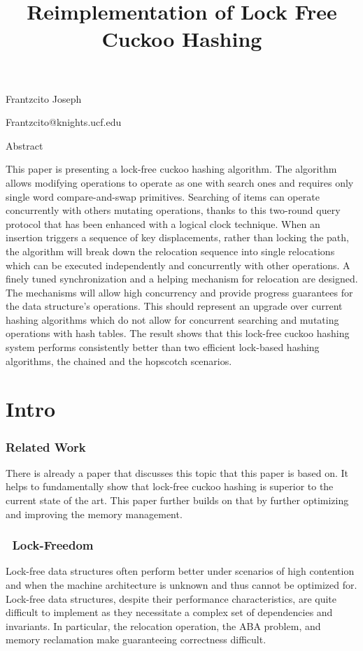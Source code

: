 \documentclass{article}
\title{}
\begin{document}
\title{Reimplementation of Lock Free Cuckoo Hashing}
\maketitle

Frantzcito Joseph

Frantzcito@knights.ucf.edu

Abstract

This paper is presenting a lock-free cuckoo hashing algorithm. The algorithm allows modifying operations to operate as
one with search ones and requires only single word compare-and-swap primitives. Searching of items can operate
concurrently with others mutating operations, thanks to this two-round query protocol that has been enhanced with a
logical clock technique. When an insertion triggers a sequence of key displacements, rather than locking the path, the
algorithm will break down the relocation sequence into single relocations which can be executed independently and
concurrently with other operations. A finely tuned synchronization and a helping mechanism for relocation are designed.
The mechanisms will allow high concurrency and provide progress guarantees for the data structure's operations. This
should represent an upgrade over current hashing algorithms which do not allow for concurrent searching and mutating
operations with hash tables. The result shows that this lock-free cuckoo hashing system performs consistently better
than two efficient lock-based hashing algorithms, the chained and the hopscotch scenarios. 

\section{Intro}
\subsubsection{Related Work}
There is already a paper that discusses this topic that this paper is based on. It helps to fundamentally show that
lock-free cuckoo hashing is superior to the current state of the art. This paper further builds on that by further
optimizing and improving the memory management.

\subsubsection[\ Lock{}-Freedom]{\ Lock-Freedom}
Lock-free data structures often perform better under scenarios of high contention and when the machine architecture is
unknown and thus cannot be optimized for. Lock-free data structures, despite their performance characteristics, are
quite difficult to implement as they necessitate a complex set of dependencies and invariants. In particular, the
relocation operation, the ABA problem, and memory reclamation make guaranteeing correctness difficult.
\end{document}
